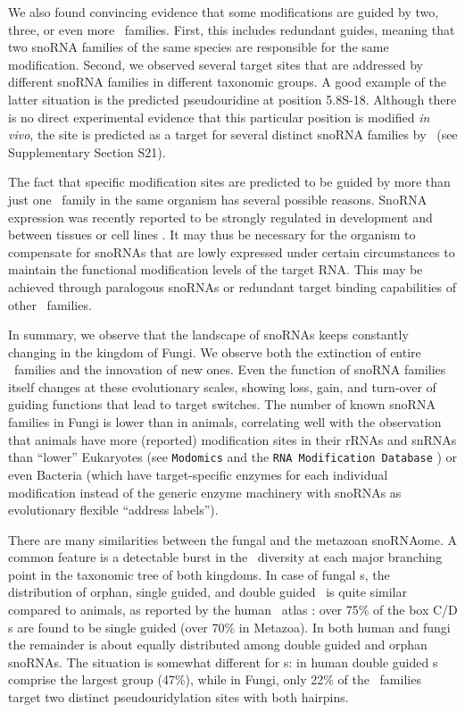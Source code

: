We also found convincing evidence that some modifications are guided by
two, three, or even more \sno\ families. First, this includes redundant
guides, meaning that two snoRNA families of the same species are
responsible for the same modification. Second, we observed several target
sites that are addressed by different snoRNA families in different
taxonomic groups. A good example of the latter situation is the predicted
pseudouridine at position 5.8S-18. Although there is no direct experimental
evidence that this particular position is modified \emph{in vivo}, the site
is predicted as a target for several distinct snoRNA families by \snoop\
(see Supplementary Section S21).

The fact that specific modification sites are predicted to be guided
by more than just one \sno\ family in the same organism has several
possible reasons. SnoRNA expression was recently reported to be
strongly regulated in development and between tissues or cell lines
\cite{Kapushesky:2012, Jorjani:2016}. It may thus be necessary for the
organism to compensate for snoRNAs that are lowly expressed under
certain circumstances to maintain the functional modification levels
of the target RNA. This may be achieved through paralogous snoRNAs or
redundant target binding capabilities of other \sno\ families.

In summary, we observe that the landscape of snoRNAs keeps constantly
changing in the kingdom of Fungi. We observe both the extinction of
entire \sno\ families and the innovation of new ones. Even the
function of snoRNA families itself changes at these evolutionary
scales, showing loss, gain, and turn-over of guiding functions that
lead to target switches. The number of known snoRNA families in Fungi
is lower than in animals, correlating well with the observation that
animals have more (reported) modification sites in their rRNAs and
snRNAs than ``lower'' Eukaryotes (see \texttt{Modomics} and the
\texttt{RNA Modification Database} \cite{Machnicka:2013,
Cantara:2011}) or even Bacteria (which have target-specific enzymes
for each individual modification instead of the generic enzyme
machinery with snoRNAs as evolutionary flexible ``address labels'').

There are many similarities between the fungal and the metazoan snoRNAome.
A common feature is a detectable burst in the \sno\ diversity at each major
branching point in the taxonomic tree of both kingdoms.  In case of fungal
\cd s, the distribution of orphan, single guided, and double guided \snos\
is quite similar compared to animals, as reported by the human \sno\ atlas
\citep{Jorjani:2016}: over 75\% of the box C/D \sno s are found to be
single guided (over 70\% in Metazoa).  In both human and fungi the
remainder is about equally distributed among double guided and orphan
snoRNAs. The situation is somewhat different for \haca s: in human double
guided \sno s comprise the largest group (47\%), while in Fungi, only 22\%
of the \haca\ families target two distinct pseudouridylation sites with
both hairpins.

